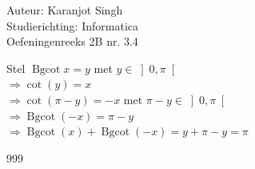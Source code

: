 \documentclass[a4paper]{article}
\begin{document}
	
\noindent \large Auteur: Karanjot Singh \\
\noindent \large Studierichting: Informatica\\
\noindent \large Oefeningenreeks 2B nr. 3.4\\
	
\normalsize

Stel $\operatorname{Bgcot} x = y$ met $y \in \left] 0, \pi \right[$ \\

$\Rightarrow \cot(y) = x$ \\

$\Rightarrow \cot(\pi - y) = -x$ met $\pi - y \in \left] 0, \pi \right[$ \\

$\Rightarrow \operatorname{Bgcot}(-x) = \pi - y$ \\

$\Rightarrow \operatorname{Bgcot}(x) + \operatorname{Bgcot}(-x) = y + \pi - y = \pi$ \\

\begin{thebibliography}{999}
\end{thebibliography}
\end{document}
